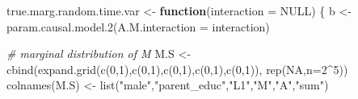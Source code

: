\documentclass[
]{book}
\newenvironment{Shaded}{\begin{snugshade}}{\end{snugshade}}
\newcommand{\AttributeTok}[1]{\textcolor[rgb]{0.77,0.63,0.00}{#1}}
\newcommand{\CommentTok}[1]{\textcolor[rgb]{0.56,0.35,0.01}{\textit{#1}}}
\newcommand{\ConstantTok}[1]{\textcolor[rgb]{0.00,0.00,0.00}{#1}}
\newcommand{\ControlFlowTok}[1]{\textcolor[rgb]{0.13,0.29,0.53}{\textbf{#1}}}
\newcommand{\DecValTok}[1]{\textcolor[rgb]{0.00,0.00,0.81}{#1}}
\newcommand{\FunctionTok}[1]{\textcolor[rgb]{0.00,0.00,0.00}{#1}}
\newcommand{\NormalTok}[1]{#1}
\newcommand{\OtherTok}[1]{\textcolor[rgb]{0.56,0.35,0.01}{#1}}
\newcommand{\SpecialCharTok}[1]{\textcolor[rgb]{0.00,0.00,0.00}{#1}}
\newcommand{\StringTok}[1]{\textcolor[rgb]{0.31,0.60,0.02}{#1}}
\begin{document}
\begin{Shaded}
\begin{Highlighting}[]
\NormalTok{true.marg.random.time.var }\OtherTok{\textless{}{-}} \ControlFlowTok{function}\NormalTok{(}\AttributeTok{interaction =} \ConstantTok{NULL}\NormalTok{) \{}
\NormalTok{  b }\OtherTok{\textless{}{-}} \FunctionTok{param.causal.model.2}\NormalTok{(}\AttributeTok{A.M.interaction =}\NormalTok{ interaction)}
  
  \CommentTok{\# marginal distribution of M}
\NormalTok{  M.S }\OtherTok{\textless{}{-}} \FunctionTok{cbind}\NormalTok{(}\FunctionTok{expand.grid}\NormalTok{(}\FunctionTok{c}\NormalTok{(}\DecValTok{0}\NormalTok{,}\DecValTok{1}\NormalTok{),}\FunctionTok{c}\NormalTok{(}\DecValTok{0}\NormalTok{,}\DecValTok{1}\NormalTok{),}\FunctionTok{c}\NormalTok{(}\DecValTok{0}\NormalTok{,}\DecValTok{1}\NormalTok{),}\FunctionTok{c}\NormalTok{(}\DecValTok{0}\NormalTok{,}\DecValTok{1}\NormalTok{),}\FunctionTok{c}\NormalTok{(}\DecValTok{0}\NormalTok{,}\DecValTok{1}\NormalTok{)), }\FunctionTok{rep}\NormalTok{(}\ConstantTok{NA}\NormalTok{,}\AttributeTok{n=}\DecValTok{2}\SpecialCharTok{\^{}}\DecValTok{5}\NormalTok{))}
  \FunctionTok{colnames}\NormalTok{(M.S) }\OtherTok{\textless{}{-}} \FunctionTok{list}\NormalTok{(}\StringTok{"male"}\NormalTok{,}\StringTok{"parent\_educ"}\NormalTok{,}\StringTok{"L1"}\NormalTok{,}\StringTok{"M"}\NormalTok{,}\StringTok{"A"}\NormalTok{,}\StringTok{"sum"}\NormalTok{)}
  

\end{Highlighting}
\end{Shaded}
\end{document}
